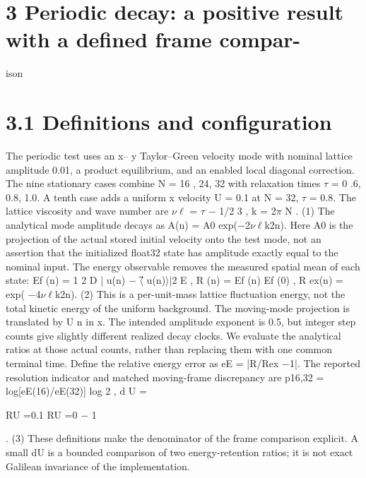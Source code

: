 \documentclass[11pt]{article}
\begin{document}
\section*{3 Periodic decay: a positive result with a defined frame compar-}

ison

\section*{3.1 Definitions and configuration}

The periodic test uses an x– y Taylor–Green velocity mode with nominal lattice amplitude 0.01, a
product equilibrium, and an enabled local diagonal correction. The nine stationary cases combine
N = 16 , 24, 32 with relaxation times \ensuremath{\tau} = 0 .6, 0.8, 1.0. A tenth case adds a uniform x velocity
U = 0.1 at N = 32, \ensuremath{\tau} = 0.8. The lattice viscosity and wave number are
\ensuremath{\nu}\ensuremath{\ell} = \ensuremath{\tau} \ensuremath{-} 1/2
3 , k = 2\ensuremath{\pi}
N . (1)
The analytical mode amplitude decays as A(n) = A0 exp(\ensuremath{-}2\ensuremath{\nu}\ensuremath{\ell}k2n). Here A0 is the projection of
the actual stored initial velocity onto the test mode, not an assertion that the initialized float32
state has amplitude exactly equal to the nominal input.
The energy observable removes the measured spatial mean of each state:
Ef (n) = 1
2
D
|⃗ u(n) \ensuremath{-} \ensuremath{\langle}⃗ u(n)\ensuremath{\rangle}|2
E
, R (n) = Ef (n)
Ef (0) , R ex(n) = exp( \ensuremath{-}4\ensuremath{\nu}\ensuremath{\ell}k2n). (2)
This is a per-unit-mass lattice fluctuation energy, not the total kinetic energy of the uniform
background. The moving-mode projection is translated by U n in x. The intended amplitude
exponent is 0.5, but integer step counts give slightly different realized decay clocks. We evaluate
the analytical ratios at those actual counts, rather than replacing them with one common terminal
time.
Define the relative energy error as eE = |R/Rex \ensuremath{-}1|. The reported resolution indicator and matched
moving-frame discrepancy are
p16,32 = log[eE(16)/eE(32)]
log 2 , d U =



RU =0.1
RU =0
\ensuremath{-} 1


. (3)
These definitions make the denominator of the frame comparison explicit. A small dU is a bounded
comparison of two energy-retention ratios; it is not exact Galilean invariance of the implementation.
\end{document}
